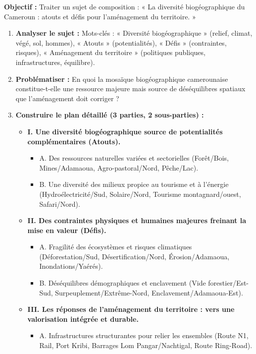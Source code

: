 \documentclass[11pt]{article}
\begin{document}
\begin{methode}
\textbf{Objectif :} Traiter un sujet de composition : « La diversité biogéographique du Cameroun : atouts et défis pour l'aménagement du territoire. »
\begin{enumerate}
    \item \textbf{Analyser le sujet :} Mots-clés : « Diversité biogéographique » (relief, climat, végé, sol, hommes), « Atouts » (potentialités), « Défis » (contraintes, risques), « Aménagement du territoire » (politiques publiques, infrastructures, équilibre).
    \item \textbf{Problématiser :} En quoi la mosaïque biogéographique camerounaise constitue-t-elle une ressource majeure mais source de déséquilibres spatiaux que l'aménagement doit corriger ?
    \item \textbf{Construire le plan détaillé (3 parties, 2 sous-parties) :}
    \begin{itemize}
        \item \textbf{I. Une diversité biogéographique source de potentialités complémentaires (Atouts).}
        \begin{itemize}
            \item A. Des ressources naturelles variées et sectorielles (Forêt/Bois, Mines/Adamaoua, Agro-pastoral/Nord, Pêche/Lac).
            \item B. Une diversité des milieux propice au tourisme et à l'énergie (Hydroélectricité/Sud, Solaire/Nord, Tourisme montagnard/ouest, Safari/Nord).
        \end{itemize}
        \item \textbf{II. Des contraintes physiques et humaines majeures freinant la mise en valeur (Défis).}
        \begin{itemize}
            \item A. Fragilité des écosystèmes et risques climatiques (Déforestation/Sud, Désertification/Nord, Érosion/Adamaoua, Inondations/Yaérés).
            \item B. Déséquilibres démographiques et enclavement (Vide forestier/Est-Sud, Surpeuplement/Extrême-Nord, Enclavement/Adamaoua-Est).
        \end{itemize}
        \item \textbf{III. Les réponses de l'aménagement du territoire : vers une valorisation intégrée et durable.}
        \begin{itemize}
            \item A. Infrastructures structurantes pour relier les ensembles (Route N1, Rail, Port Kribi, Barrages Lom Pangar/Nachtigal, Route Ring-Road).

\end{itemize}
\end{itemize}
\end{enumerate}
\end{methode}
\end{document}
